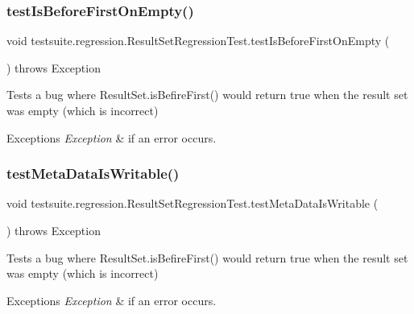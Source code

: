 \subsubsection{\texorpdfstring{test\+Is\+Before\+First\+On\+Empty()}{testIsBeforeFirstOnEmpty()}}
{\footnotesize\ttfamily void testsuite.\+regression.\+Result\+Set\+Regression\+Test.\+test\+Is\+Before\+First\+On\+Empty (\begin{DoxyParamCaption}{ }\end{DoxyParamCaption}) throws Exception}

Tests a bug where Result\+Set.\+is\+Befire\+First() would return true when the result set was empty (which is incorrect)


\begin{DoxyExceptions}{Exceptions}
{\em Exception} & if an error occurs. \\
\hline
\end{DoxyExceptions}
\mbox{\label{classtestsuite_1_1regression_1_1_result_set_regression_test_a6dcc88835bfc825c76f2b561299ba5ae}} 
\subsubsection{\texorpdfstring{test\+Meta\+Data\+Is\+Writable()}{testMetaDataIsWritable()}}
{\footnotesize\ttfamily void testsuite.\+regression.\+Result\+Set\+Regression\+Test.\+test\+Meta\+Data\+Is\+Writable (\begin{DoxyParamCaption}{ }\end{DoxyParamCaption}) throws Exception}

Tests a bug where Result\+Set.\+is\+Befire\+First() would return true when the result set was empty (which is incorrect)


\begin{DoxyExceptions}{Exceptions}
{\em Exception} & if an error occurs. \\
\hline
\end{DoxyExceptions}
\mbox{\label{classtestsuite_1_1regression_1_1_result_set_regression_test_a0c13a2fe761dffa7df042ede36d977f4}} 
